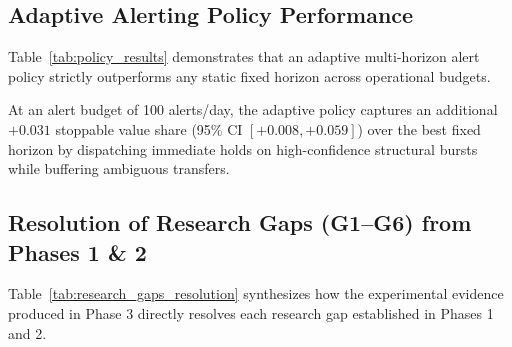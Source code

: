 \documentclass[11pt,a4paper]{article}
\begin{document}
\subsection{Adaptive Alerting Policy Performance}
Table~\ref{tab:policy_results} demonstrates that an adaptive multi-horizon alert policy strictly outperforms any static fixed horizon across operational budgets.

\begin{table}[ht]
\centering
\small
\caption{\textbf{Adaptive Multi-Horizon Alerting Policy vs. Best Fixed Horizon.}}
\label{tab:policy_results}
\resizebox{\columnwidth}{!}{%
%
}
\end{table}

At an alert budget of 100 alerts/day, the adaptive policy captures an additional $+0.031$ stoppable value share (95\% CI $[+0.008, +0.059]$) over the best fixed horizon by dispatching immediate holds on high-confidence structural bursts while buffering ambiguous transfers.

\subsection{Resolution of Research Gaps (G1--G6) from Phases 1 \& 2}
Table~\ref{tab:research_gaps_resolution} synthesizes how the experimental evidence produced in Phase 3 directly resolves each research gap established in Phases 1 and 2.
\end{document}
